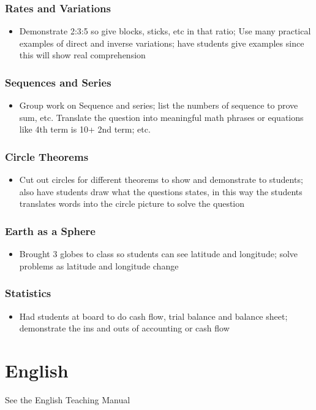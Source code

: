 \subsubsection{Rates and Variations}
\begin{itemize}
\item	Demonstrate 2:3:5 so give blocks, sticks, etc in that ratio;  Use many practical examples of direct and inverse variations; have students give examples since this will show real comprehension
\end{itemize}

\subsubsection{Sequences and Series}
\begin{itemize}
\item	Group work on Sequence and series; list the numbers of sequence to prove sum, etc.  Translate the question into meaningful math phrases or equations like 4th term is 10+ 2nd term; etc.
\end{itemize}

\subsubsection{Circle Theorems}
\begin{itemize}
\item	Cut out circles for different theorems to show and demonstrate to students; also have students draw what the questions states, in this way the students translates words into the circle picture to solve the question
\end{itemize}

\subsubsection{Earth as a Sphere}
\begin{itemize}
\item	Brought 3 globes to class so students can see latitude and longitude; solve problems as latitude and longitude change
\end{itemize}

\subsubsection{Statistics}
\begin{itemize}
\item	Had students at board to do cash flow, trial balance and balance sheet; demonstrate the ins and outs of accounting or cash flow
\end{itemize}

\section{English}
See the English Teaching Manual
